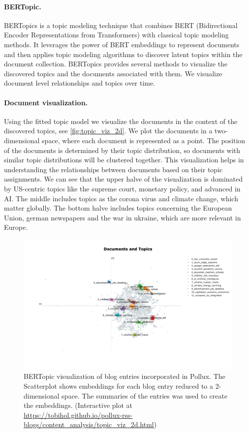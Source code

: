 \documentclass{article}
\begin{document}
\paragraph{BERTopic.} 
BERTopics \citep{grootendorstBERTopicNeuralTopic2022} is a topic modeling technique that combines BERT (Bidirectional Encoder Representations from Transformers) with classical topic modeling methods. It leverages the power of BERT embeddings to represent documents and then applies topic modeling algorithms to discover latent topics within the document collection.
BERTopics provides several methods to visualize the discovered topics and the documents associated with them. We visualize document level relationships and topics over time.

\paragraph{Document visualization.}
Using the fitted topic model we visualize the documents in the context of the discovered topics, see \autoref{fig:topic_viz_2d}. We plot the documents in a two-dimensional space, where each document is represented as a point. The position of the documents is determined by their topic distribution, so documents with similar topic distributions will be clustered together. This visualization helps in understanding the relationships between documents based on their topic assignments. We can see that the upper halve of the visualization is dominated by US-centric topics like the supreme court, monetary policy, and advanced in AI. The middle includes topics as the corona virus and climate change, which matter globally. The bottom halve includes topics concerning the European Union, german newspapers and the war in ukraine, which are more relevant in Europe.

\begin{figure}[!htb]
	\includegraphics[width=1.0\textwidth]{figures/topic_viz_2d.png}
	\caption{BERTopic visualization of blog entries incorporated in Pollux. The Scatterplot shows embeddings for each blog entry reduced to a 2-dimensional space. The summaries of the entries was used to create the embeddings. (Interactive plot at \url{https://tobihol.github.io/pollux-rss-blogs/content_analysis/topic_viz_2d.html})}
	\label{fig:topic_viz_2d}
\end{figure}
\end{document}
